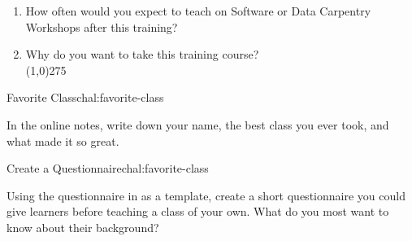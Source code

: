 \begin{enumerate}

\item
  How often would you expect to teach on Software or Data Carpentry
  Workshops after this training?


\item
  Why do you want to take this training course?\\
  \line(1,0){275}

\end{enumerate}


\begin{challenge}{Favorite Class}{chal:favorite-class}

In the online notes, write down your name, the best class you ever
took, and what made it so great.

\end{challenge}

\begin{challenge}{Create a Questionnaire}{chal:favorite-class}

Using the questionnaire in  as a template,
create a short questionnaire you could give learners before teaching a
class of your own.  What do you most want to know about their
background?

\end{challenge}
